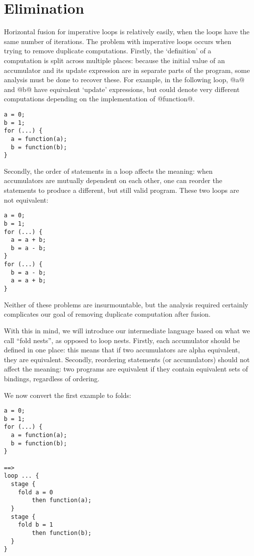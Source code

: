 \chapter{Elimination}
\label{icicle:s:Elimination}


Horizontal fusion for imperative loops is relatively easily, when the loops have the same number of iterations.
The problem with imperative loops occurs when trying to remove duplicate computations.
Firstly, the `definition' of a computation is split across multiple places: because the initial value of an accumulator and its update expression are in separate parts of the program, some analysis must be done to recover these.
For example, in the following loop, @a@ and @b@ have equivalent `update' expressions, but could denote very different computations depending on the implementation of @function@.
\begin{lstlisting}
a = 0;
b = 1;
for (...) {
  a = function(a);
  b = function(b);
}
\end{lstlisting}

Secondly, the order of statements in a loop affects the meaning: when accumulators are mutually dependent on each other, one can reorder the statements to produce a different, but still valid program.
These two loops are not equivalent:
\begin{lstlisting}
a = 0;
b = 1;
for (...) {
  a = a + b;
  b = a - b;
}
for (...) {
  b = a - b;
  a = a + b;
}
\end{lstlisting}

Neither of these problems are insurmountable, but the analysis required certainly complicates our goal of removing duplicate computation after fusion.

With this in mind, we will introduce our intermediate language based on what we call ``fold nests'', as opposed to loop nests.
Firstly, each accumulator should be defined in one place: this means that if two accumulators are alpha equivalent, they are equivalent.
Secondly, reordering statements (or accumulators) should not affect the meaning: two programs are equivalent if they contain equivalent sets of bindings, regardless of ordering.

We now convert the first example to folds:
\begin{lstlisting}
a = 0;
b = 1;
for (...) {
  a = function(a);
  b = function(b);
}

==>
loop ... {
  stage {
    fold a = 0
        then function(a);
  }
  stage {
    fold b = 1
        then function(b);
  }
}
\end{lstlisting}

